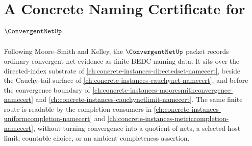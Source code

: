 \chapter{A Concrete Naming Certificate for $\ConvergentNetUp$}
\label{ch:concrete-instances-convergent-net-namecert}

Following Moore--Smith and Kelley, the $\ConvergentNetUp$ packet records ordinary convergent-net evidence as finite BEDC naming data. It sits over the directed-index substrate of \autoref{ch:concrete-instances-directedset-namecert}, beside the Cauchy-tail surface of \autoref{ch:concrete-instances-cauchynet-namecert}, and before the convergence boundary of \autoref{ch:concrete-instances-mooresmithconvergence-namecert} and \autoref{ch:concrete-instances-cauchynetlimit-namecert}. The same finite route is readable by the completion consumers in \autoref{ch:concrete-instances-uniformcompletion-namecert} and \autoref{ch:concrete-instances-metriccompletion-namecert}, without turning convergence into a quotient of nets, a selected host limit, countable choice, or an ambient completeness assertion.

